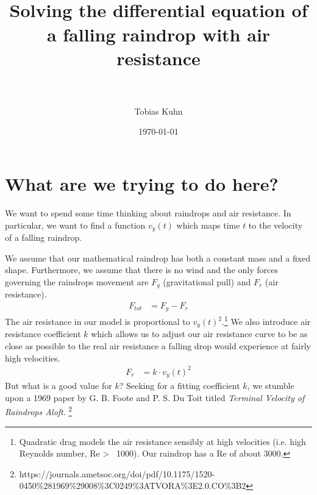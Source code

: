 \documentclass[paper=a4, fontsize=11pt]{scrartcl} %
\title{
\normalfont \normalsize 
\horrule{0.5pt} \\[0.4cm] %
\huge Solving the differential equation of a falling raindrop with air resistance\\ %
\horrule{2pt} \\[0.5cm] %
}
\author{Tobias Kuhn} %
\date{\normalsize\today} %
\numberwithin{equation}{section} %
\numberwithin{figure}{section} %
\numberwithin{table}{section} %
\begin{document}
\maketitle %

\section{What are we trying to do here?}

We want to spend some time thinking about raindrops and air resistance. 
In particular, we want to find a function $v_y(t)$ which maps time $t$ to the velocity 
of a falling raindrop. \vspace{\baselineskip}

We assume that our mathematical raindrop has both a constant mass and a fixed shape.
Furthermore, we assume that there is no wind and the only forces governing the raindrops movement are 
$F_g$ (gravitational pull) and $F_r$ (air resistance).
\begin{align} \label{eq:1}
F_{tot} &= F_g - F_r
\end{align}
The air resistance in our model is proportional to $v_y(t)^2$.\footnote{Quadratic drag models the air resistance sensibly at 
high velocities (i.e. high Reynolds number, Re > ~1000). Our raindrop has a Re of about 3000.} We also introduce air resistance coefficient $k$ 
which allows us to adjust our air resistance curve to be as close as possible to the real air resistance a falling drop would experience
at fairly high velocities.
\begin{align} \label{eq:2}
F_r &= k \cdot v_y(t)^2
\end{align}
But what is a good value for $k$? Seeking for a fitting coefficient $k$, we stumble upon a 1969 paper 
by G. B. Foote and P. S. Du Toit titled \textit{Terminal Velocity of Raindrops Aloft}.
\footnote{ https://journals.ametsoc.org/doi/pdf/10.1175/1520-0450\%281969\%29008\%3C0249\%3ATVORA\%3E2.0.CO\%3B2 }
\vspace{\baselineskip}
\end{document}
